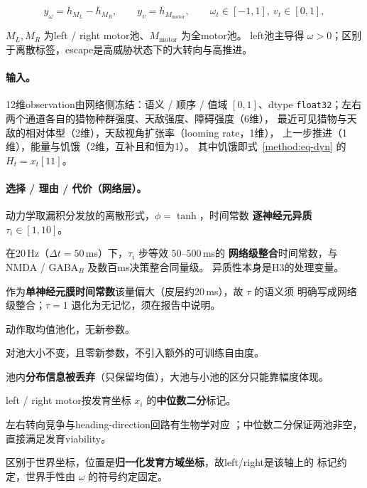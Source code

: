 \begin{equation}\label{method:eq-action}
y_\omega=\overline{h}_{M_L}-\overline{h}_{M_R},\qquad
y_v=\overline{h}_{M_{\mathrm{motor}}},\qquad
\omega_t\in[-1,1],\ v_t\in[0,1],
\end{equation}

$M_L,M_R$ 为left / right motor池、$M_{\mathrm{motor}}$ 为全motor池。
left池主导得 $\omega>0$；区别于离散标签，escape是高威胁状态下的大转向与高推进。

\paragraph{输入。}12维observation由网络侧冻结：语义 / 顺序 / 值域 $[0,1]$、dtype
\texttt{float32}；左右两个通道各自的猎物种群强度、天敌强度、障碍强度（6维），
最近可见猎物与天敌的相对体型（2维），天敌视角扩张率（looming rate，1维），
上一步推进（1维），能量与饥饿（2维，互补且和恒为1）。
其中饥饿即式~\eqref{method:eq-dyn} 的 $H_t=x_t[11]$。

\paragraph{选择 / 理由 / 代价（网络层）。}

\begin{description}
  \item 动力学取漏积分发放的离散形式，$\phi=\tanh$，时间常数 \textbf{逐神经元异质}
        $\tau_i\in[1,10]$。
  \item 在20\,Hz（$\Delta t=50$\,ms）下，$\tau_i$ 步等效 $50$–$500$\,ms的
        \textbf{网络级整合}时间常数，与NMDA / GABA$_B$ 及数百ms决策整合同量级。
        异质性本身是H3的处理变量。
  \item[代价] 作为\textbf{单神经元膜时间常数}该量偏大（皮层约20\,ms），故 $\tau$ 的语义须
        明确写成网络级整合；$\tau=1$ 退化为无记忆，须在报告中说明。
\end{description}

\begin{description}
  \item 动作取均值池化，无新参数。
  \item 对池大小不变，且零新参数，不引入额外的可训练自由度。
  \item[代价] 池内\textbf{分布信息被丢弃}（只保留均值），大池与小池的区分只能靠幅度体现。
\end{description}

\begin{description}
  \item left / right motor按发育坐标 $x_i$ 的\textbf{中位数二分}标记。
  \item 左右转向竞争与heading-direction回路有生物学对应
        \citep{bib6_petrucco2023,bib7_dunn2016}；中位数二分保证两池非空，
        直接满足发育viability。
  \item[代价] 区别于世界坐标，位置是\textbf{归一化发育方域坐标}，故left/right是该轴上的
        标记约定，世界手性由 $\omega$ 的符号约定固定。
\end{description}

